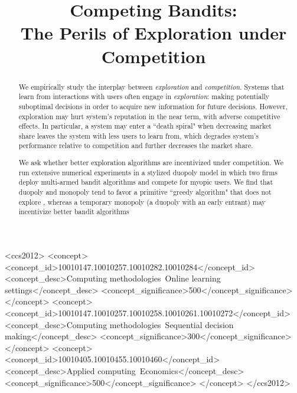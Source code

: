 \documentclass[sigconf, anonymous, review,natbib=false]{acmart}
\theoremstyle{definition}
\begin{document}
\title[Competing Bandits: The Perils of Exploration under Competition]
{Competing Bandits: \\ The Perils of Exploration under Competition}


\begin{abstract}
We empirically study the interplay between \textit{exploration} and \textit{competition}. Systems that learn from interactions with users often engage in \emph{exploration}: making potentially suboptimal decisions in order to acquire new information for future decisions. However, exploration may hurt system's reputation in the near term, with adverse competitive effects. In particular, a system may enter a ``death spiral" when decreasing market share leaves the system with less users to learn from, which degrades system's performance relative to competition and further decreases the market share.

We ask whether better exploration algorithms are incentivized under competition. We run extensive numerical experiments in a stylized duopoly model in which two firms deploy multi-armed bandit algorithms and compete for myopic users.  We find that duopoly and monopoly tend to favor a primitive ``greedy algorithm" that does not explore , whereas a temporary monopoly (a duopoly with an early entrant) may incentivize better bandit algorithms 
\end{abstract}

%
%
\begin{CCSXML}
<ccs2012>
<concept>
<concept_id>10010147.10010257.10010282.10010284</concept_id>
<concept_desc>Computing methodologies~Online learning settings</concept_desc>
<concept_significance>500</concept_significance>
</concept>
<concept>
<concept_id>10010147.10010257.10010258.10010261.10010272</concept_id>
<concept_desc>Computing methodologies~Sequential decision making</concept_desc>
<concept_significance>300</concept_significance>
</concept>
<concept>
<concept_id>10010405.10010455.10010460</concept_id>
<concept_desc>Applied computing~Economics</concept_desc>
<concept_significance>500</concept_significance>
</concept>
</ccs2012>
\end{CCSXML}
\end{document}

